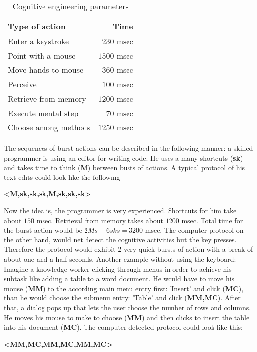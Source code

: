 \begin{table}[ht]
    \centering
    \begin{tabular}{lr} \toprule
    Type of action & Time \\ \midrule
    Enter a keystroke  & $230$ msec \\
    Point with a mouse  & $1500$ msec \\
    Move hands to mouse  & $360$ msec \\
    Perceive  & $100$ msec \\
    Retrieve from memory  & $1200$ msec \\
    Execute mental step  & $70$ msec \\
    Choose among methods  & $1250$ msec \\
    \bottomrule
\end{tabular}
 \caption{Cognitive engineering parameters}
 \label{tab1}
\end{table}

The sequences of burst actions can be described in the following manner: a skilled programmer is using an editor for writing code. He uses a many shortcuts (\textbf{sk}) and takes time to think (\textbf{M}) between busts of actions. A typical protocol of his text edits could look like the following
\begin{center}
  \textbf{<M,sk,sk,sk,M,sk,sk,sk>}
\end{center} 

Now the idea is, the programmer is very experienced. Shortcuts for him take about $150$ msec. Retrieval from memory takes about $1200$ msec. Total time for the burst action would be $ 2Ms + 6sks = 3200$ msec. The computer protocol on the other hand, would net detect the cognitive activities but the key presses. Therefore the protocol would exhibit 2 very quick bursts of action with a break of about one and a half seconds. 
Another example without using the keyboard: Imagine a knowledge worker clicking through menus in order to achieve his subtask like adding a table to a word document. He would have to move his mouse (\textbf{MM}) to the according main menu entry first: 'Insert' and click (\textbf{MC}), than he would choose the submenu entry: 'Table' and click (\textbf{MM,MC}). After that, a dialog pops up that lets the user choose the number of rows and columns. He moves his mouse to make to choose (\textbf{MM}) and then clicks to insert the table into his document (\textbf{MC}). The computer detected protocol could look like this:
\begin{center}
  \textbf{<MM,MC,MM,MC,MM,MC>}
\end{center} 


